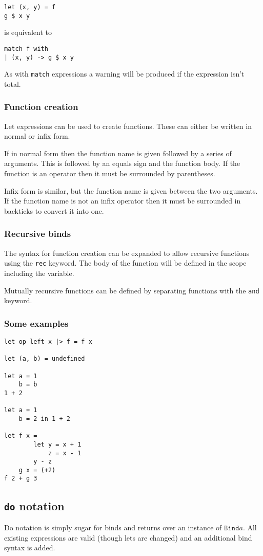 \begin{verbatim}
let (x, y) = f
g $ x y
\end{verbatim}
is equivalent to
\begin{verbatim}
match f with
| (x, y) -> g $ x y
\end{verbatim}

As with \texttt{match} expressions a warning will be produced if the expression isn’t total.

\subsubsection{Function creation}
Let expressions can be used to create functions. These can either be written in normal or infix form.

If in normal form then the function name is given followed by a series of arguments. This is followed by an equals sign and the function body. If the function is an operator then it must be surrounded by parentheses.

Infix form is similar, but the function name is given between the two arguments. If the function name is not an infix operator then it must be surrounded in backticks to convert it into one.

\subsubsection{Recursive binds}
The syntax for function creation can be expanded to allow recursive functions using the \texttt{rec} keyword. The body of the function will be defined in the scope including the variable.

Mutually recursive functions can be defined by separating functions with the \texttt{and} keyword.

\subsubsection{Some examples}
\begin{verbatim}
let op left x |> f = f x

let (a, b) = undefined

let a = 1
    b = b
1 + 2

let a = 1
    b = 2 in 1 + 2
    
let f x = 
        let y = x + 1
            z = x - 1
        y - z
    g x = (+2)
f 2 + g 3
\end{verbatim}

\subsection{\texttt{do} notation}
Do notation is simply sugar for binds and returns over an instance of $\mathtt{Bind} a$. All existing expressions are valid (though lets are changed) and an additional bind syntax is added.

